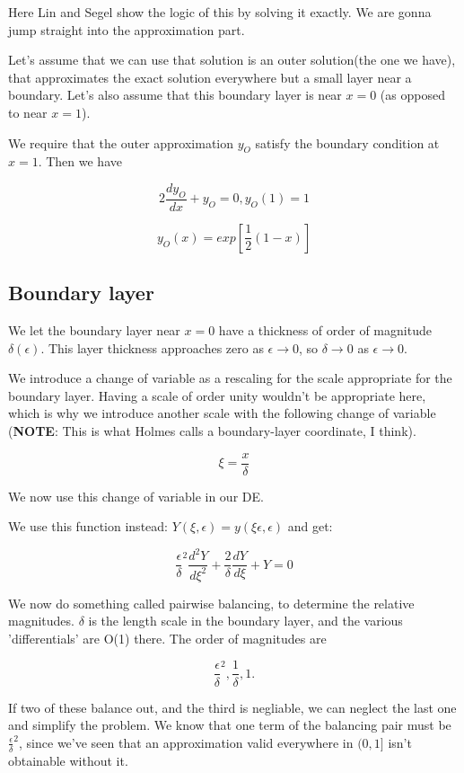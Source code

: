 \documentclass[12pt]{report}
\begin{document}
Here Lin and Segel show the logic of this by solving it exactly. We
are gonna jump straight into the approximation part.

Let's assume that we can use that solution is an outer solution(the one
we have), that approximates the exact solution everywhere but a small layer
near a boundary.  Let's also assume that this boundary layer is near $x=0$ (as opposed to near $x=1$).

We require that the outer approximation $y_O$ satisfy the boundary
condition at $x=1$. Then we have

$$2 \frac{dy_O}{dx} + y_O = 0, y_O(1)=1$$

$$y_O(x) = exp[\frac 1 2 (1-x)]$$

\subsection{Boundary layer}

We let the boundary layer near $x=0$ have a thickness of order of
magnitude $\delta(\epsilon)$. This layer thickness approaches zero as
$\epsilon \to 0$, so $\delta \to 0$ as $\epsilon \to 0$.

We introduce a change of variable as a rescaling for the scale
appropriate for the boundary layer. Having a scale of order unity
wouldn't be appropriate here, which is why we introduce another scale
with the following change of variable (\textbf{NOTE}: This is what Holmes calls a boundary-layer coordinate, I think).

$$\xi = \frac x \delta$$

We now use this change of variable in our DE.

We use this function instead: $Y(\xi, \epsilon) = y(\xi \epsilon,
\epsilon)$ and get:

$$\frac \epsilon \delta^2 \frac{d^2Y}{d\xi^2} + \frac 2 \delta
\frac{dY}{d\xi} + Y = 0$$

We now do something called pairwise balancing, to determine the
relative magnitudes. $\delta$ is the length scale in the boundary
layer, and the various 'differentials' are O(1) there. The order of
magnitudes are

$$\frac \epsilon \delta^2, \frac 1 \delta, 1.$$

If two of these balance out, and the third is negliable, we can
neglect the last one and simplify the problem. We know that one term of
the balancing pair must be $\frac \epsilon \delta^2$, since we've seen
that an approximation valid everywhere in $(0,1]$ isn't obtainable
  without it.
\end{document}
